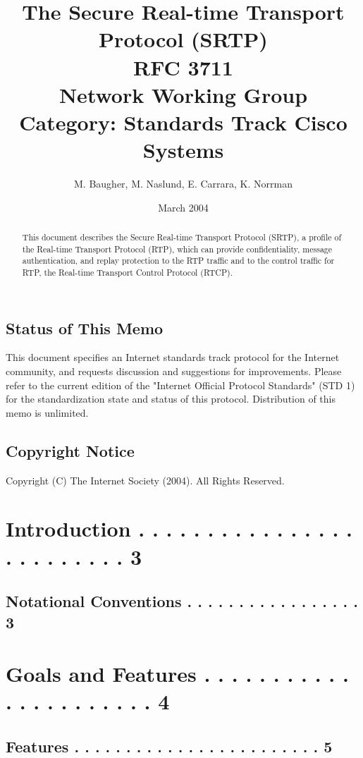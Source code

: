 \documentclass{article}
\title{The Secure Real-time Transport Protocol (SRTP)\\[1em]
\large RFC 3711\\
Network Working Group\\
Category: Standards Track                            Cisco Systems}
\author{M. Baugher, M. Naslund, E. Carrara, K. Norrman}
\date{March 2004}
\begin{document}
\maketitle

\begin{abstract}
This document describes the Secure Real-time Transport Protocol (SRTP), a profile of the Real-time Transport Protocol (RTP), which can provide confidentiality, message authentication, and replay protection to the RTP traffic and to the control traffic for RTP, the Real-time Transport Control Protocol (RTCP).
\end{abstract}

\subsection*{Status of This Memo}
This document specifies an Internet standards track protocol for the Internet community, and requests discussion and suggestions for improvements.  Please refer to the current edition of the "Internet Official Protocol Standards" (STD 1) for the standardization state and status of this protocol.  Distribution of this memo is unlimited.

\subsection*{Copyright Notice}
Copyright (C) The Internet Society (2004).  All Rights Reserved.

\tableofcontents
\newpage

\section{Introduction . . . . . . . . . . . . . . . . . . . . . . . . .  3}

\subsection{Notational Conventions . . . . . . . . . . . . . . . . .  3}

\section{Goals and Features . . . . . . . . . . . . . . . . . . . . . .  4}

\subsection{Features . . . . . . . . . . . . . . . . . . . . . . . .  5}
\end{document}
